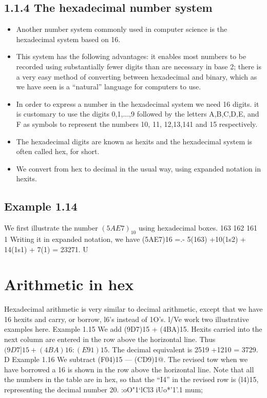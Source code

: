 \documentclass[a4paper,12pt]{article}
\begin{document}
\subsection{1.1.4 The hexadecimal number system}
\begin{itemize}
    \item Another number system commonly used in computer science is the hexadecimal system based
on 16. 
\item This system has the following advantages: it enables most numbers to be recorded using
substantially fewer digits than are necessary in base 2; there is a very easy method of converting
between hexadecimal and binary, which as we have seen is a “natural” language for computers to
use.
\item In order to express a number in the hexadecimal system we need 16 digits. it is customary to
use the digits 0,1,...,9 followed by the letters A,B,C,D,E, and F as symbols to represent the
numbers 10, 11, 12,13,141 and 15 respectively. 
\item The hexadecimal digits are known as hexits and
the hexadecimal system is often called hex, for short.
\item We convert from hex to decimal in the usual way, using expanded notation in hexits.
\end{itemize}

\subsection{Example 1.14} We first illustrate the number $(5AE7)_{10}$ using hexadecimal boxes.
163 162 161 1
Writing it in expanded notation, we have
(5AE7)16 =.- 5(163) +10(1s2) + 14(1s1) + 7(1)
= 23271. U
\section{Arithmetic in hex}
Hexadecimal arithmetic is very similar to decimal arithmetic, except that we have 16 hexits and
carry, or borrow, l6’s instead of 1O’s. l/Ve work two illustrative examples here.
Example 1.15 We add (9D7)15 + (4BA)15. Hexits carried into the next column are entered in
the row above the horizontal line.
Thus $(9D7]15 + (4BA)16 : (E91)15$. The decimal equivalent is 2519 +1210 = 3729. D
Example 1.16 We subtract (F04)15 — (CD9)1@. The revised tow when we have borrowed a 16 is
shown in the row above the horizontal line. Note that all the numbers in the table are in hex, so
that the “I4” in the revised row is (l4)15, representing the decimal number 20.
:oO"1‘lCl3
i\:Uo*'1'.1
mum;
\end{document}
